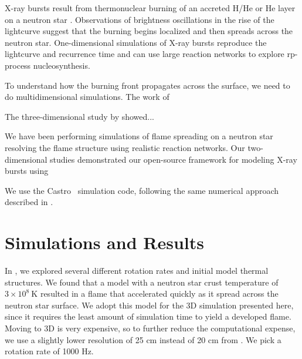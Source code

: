 \documentclass[preprint,times,tighten]{aastex631}
\newcommand{\castro}{{\sf Castro}}
\begin{document}
X-ray bursts result from thermonuclear burning of an accreted H/He or
He layer on a neutron star \citep{galloway:2017}.  Observations of
brightness oscillations in the rise of the lightcurve suggest that the
burning begins localized and then spreads across the neutron star.
One-dimensional simulations of X-ray bursts reproduce the lightcurve
and recurrence time \citep{woosley-xrb} and can use large reaction
networks to explore rp-process nucleosynthesis.

To understand how the burning front propagates across the surface, we
need to do multidimensional simulations.  The work of
\citet{cavecchi:2013,art-2015-cavecchi-etal,art-2016-cavecchi-etal}

The three-dimensional study by \citet{Cavecchi2019} showed...

We have been performing simulations of flame spreading on a neutron
star resolving the flame structure using realistic reaction networks.  Our two-dimensional studies \citep{eiden:2020,harpole:2021} demonstrated our open-source framework for modeling X-ray bursts using 

We use the \castro\ \citep{castro,castro_joss} simulation code, following
the same numerical approach described in \citet{eiden:2020,harpole:2021}.

\section{Simulations and Results}\label{Sec:results}

In \citet{harpole:2021}, we explored several different rotation rates
and initial model thermal structures.  We found that a model with a
neutron star crust temperature of $3\times 10^8~\mathrm{K}$ resulted
in a flame that accelerated quickly as it spread across the neutron
star surface.  We adopt this model for the 3D simulation presented
here, since it requires the least amount of simulation time to yield a
developed flame.  Moving to 3D is very expensive, so to further reduce
the computational expense, we use a slightly lower resolution of 25 cm
instead of 20 cm from \citet{harpole:2021}.  We pick a rotation rate
of 1000 Hz.
\end{document}
